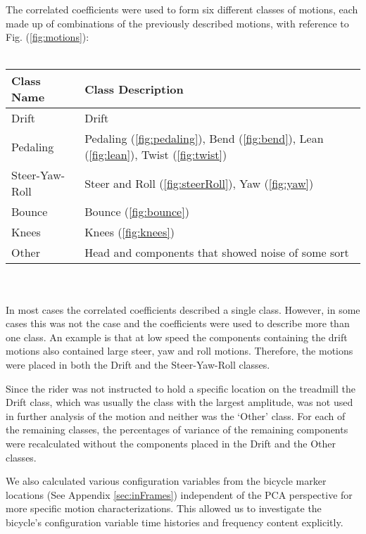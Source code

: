 \documentclass[smallextended]{svjour3}     %
\begin{document}
The correlated coefficients were used to form six different classes of motions,
each made up of combinations of the previously described motions, with
reference to Fig. (\ref{fig:motions}):\\
\\
\begin{tabular}[]{ll}
    Class Name & Class Description\\
    \hline
    Drift & Drift\\
    Pedaling & Pedaling (\ref{fig:pedaling}), Bend (\ref{fig:bend}), Lean
        (\ref{fig:lean}), Twist (\ref{fig:twist})\\
    Steer-Yaw-Roll & Steer and Roll (\ref{fig:steerRoll}), Yaw
        (\ref{fig:yaw})\\
    Bounce & Bounce (\ref{fig:bounce})\\
    Knees & Knees (\ref{fig:knees})\\
    Other & Head and components that showed noise of some
    sort
\end{tabular}\\
\\
In most cases the correlated coefficients described a single class. However, in
some cases this was not the case and the coefficients were used to describe
more than one class. An example is that at low speed the components containing
the drift motions also contained large steer, yaw and roll motions. Therefore,
the motions were placed in both the Drift and the Steer-Yaw-Roll classes.

Since the rider was not instructed to hold a specific location on the treadmill
the Drift class, which was usually the class with the largest amplitude, was
not used in further analysis of the motion and neither was the `Other' class.
For each of the remaining classes, the percentages of variance of the remaining
components were recalculated without the components placed in the Drift and the
Other classes.

We also calculated various configuration variables from the bicycle marker locations
(See Appendix \ref{sec:inFrames}) independent of the PCA perspective for more
specific motion characterizations. This allowed us to investigate the bicycle's
configuration variable time histories and frequency content explicitly.
\end{document}
